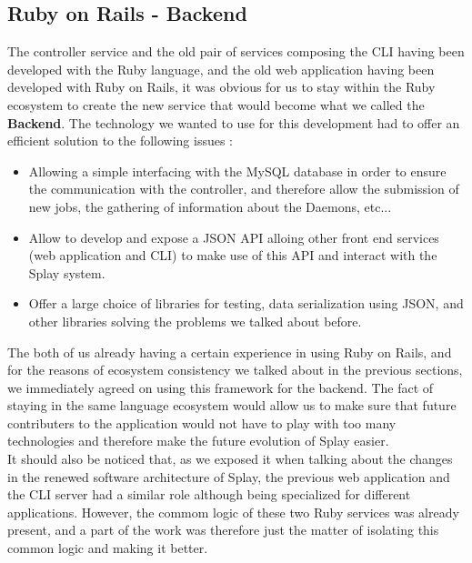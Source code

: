 \documentclass{eplmastersthesis}
\begin{document}
      \subsection{Ruby on Rails - Backend}

        The controller service and the old pair of services composing the CLI
        having been developed with the Ruby language, and the old web
        application having been developed with Ruby on Rails, it was obvious
        for us to stay within the Ruby ecosystem to create the new service
        that would become what we called the \textbf{Backend}. The technology
        we wanted to use for this development had to offer an efficient
        solution to the following issues :

        \begin{itemize}
          \item Allowing a simple interfacing with the MySQL database in order
          to ensure the communication with the controller, and therefore allow
          the submission of new jobs, the gathering of information about the
          Daemons, etc...
          \item Allow to develop and expose a JSON API alloing other front
          end services (web application and CLI) to make use of this API and
          interact with the Splay system.
          \item Offer a large choice of libraries for testing, data
          serialization using JSON, and other libraries solving the problems
          we talked about before.
        \end{itemize}

        The both of us already having a certain experience in using Ruby on
        Rails, and for the reasons of ecosystem consistency we talked about
        in the previous sections, we immediately agreed on using this
        framework for the backend. The fact of staying in the same language
        ecosystem would allow us to make sure that future contributers to
        the application would not have to play with too many technologies and
        therefore make the future evolution of Splay easier.\\
        It should also be noticed that, as we exposed it when talking about the
        changes in the renewed software architecture of Splay, the previous
        web application and the CLI server had a similar role although being
        specialized for different applications. However, the commom logic
        of these two Ruby services was already present, and a part of the
        work was therefore just the matter of isolating this common logic
        and making it better.\\
\end{document}
